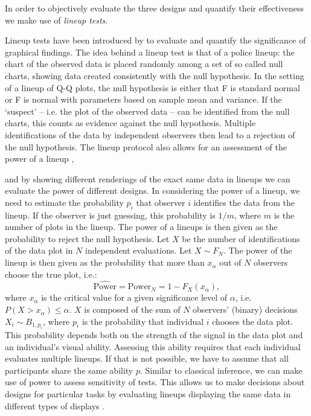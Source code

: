 \documentclass{article}\usepackage[]{graphicx}\usepackage[]{color}
\newcommand{\hh}[1]{{\color{magenta} #1}}
\begin{document}
\hh{In order to objectively evaluate  the three designs and quantify their effectiveness we make use of {\it lineup tests}.}

Lineup tests have been introduced by \citet{buja:2009hp} to evaluate and quantify the significance of graphical findings. The idea behind a lineup test is that of a police lineup: the chart of the observed data is placed randomly among a set of so called null charts, showing data created consistently with the null hypothesis. \hh{In the setting of a lineup of Q-Q plots, the null hypothesis  is either that F is standard normal or F is normal with parameters based on sample mean and variance.}
If the `suspect' -- i.e. the plot of the observed data -- can be identified from the null charts, this counts as evidence against the null hypothesis. Multiple identifications of the data by independent observers then lead to a rejection of the null hypothesis. 
The lineup protocol also allows for an assessment of the power of a lineup \citep{mahbub:2013},  

\hh{and by showing different renderings of the exact same data in lineups we can evaluate the power  of different designs.}
\hh{In considering the power of a lineup, we need to estimate the probability $p_i$ that observer $i$ identifies the data from the lineup. If the observer is just guessing, this probability is $1/m$, where $m$ is the number of plots in the lineup.}
The power of a lineups is then given as the probability to reject the null hypothesis. Let $X$ be the number of identifications of the data plot in $N$ independent evaluations. Let $X \sim F_N$. The power of the lineup is then given as the probability that more than $x_\alpha$ out of $N$ observers
choose the true plot, i.e.:
\begin{equation}\label{eqn:power}
\widehat{\text{Power}} = \text{Power}_{N} = 1 - F_{X} (x_{\alpha}),
\end{equation}
where $x_\alpha$ is the critical value for a given significance level of $\alpha$, i.e.~$P(X >  x_{\alpha}) \le \alpha$. $X$ is composed of the sum of $N$ observers' (binary) decisions $X_i \sim B_{1, p_i}$, where  $p_i$ is the probability that individual $i$ chooses the data plot. This probability  depends both on the strength of the signal in the data plot and an individual's visual ability.
Assessing this ability requires that each individual evaluates multiple lineups. 
If that is not possible, we have to assume that all participants share the same ability $p$.%
Similar to classical inference, we can make use of power to assess sensitivity of tests. This allows us to make decisions about designs for particular tasks by evaluating lineups displaying  the same data in different types of displays \citep{Hofmann:2012ts}. 
\end{document}
